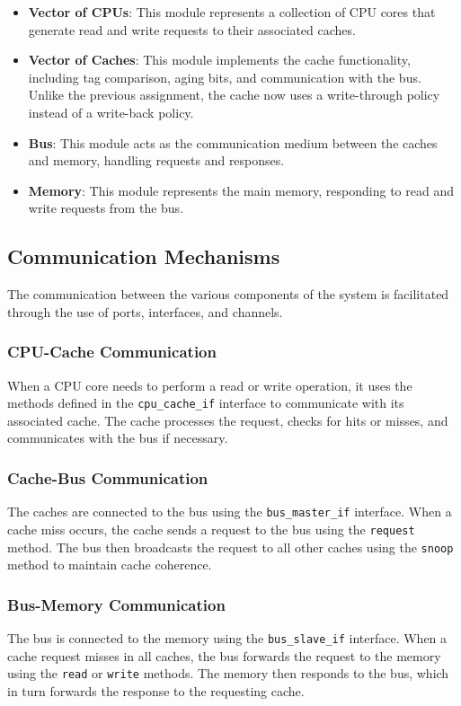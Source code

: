 \begin{itemize}
    \item \textbf{Vector of CPUs}: This module represents a collection of CPU cores that generate read and write requests to their associated caches.
    \item \textbf{Vector of Caches}: This module implements the cache functionality, including tag comparison, aging bits, and communication with the bus. Unlike the previous assignment, the cache now uses a write-through policy instead of a write-back policy.
    \item \textbf{Bus}: This module acts as the communication medium between the caches and memory, handling requests and responses.
    \item \textbf{Memory}: This module represents the main memory, responding to read and write requests from the bus.
\end{itemize}

\subsection{Communication Mechanisms}
The communication between the various components of the system is facilitated through the use of ports, interfaces, and channels.

\subsubsection{CPU-Cache Communication}
When a CPU core needs to perform a read or write operation, it uses the methods defined in the \texttt{cpu\_cache\_if} interface to communicate with its associated cache. The cache processes the request, checks for hits or misses, and communicates with the bus if necessary.

\subsubsection{Cache-Bus Communication}
The caches are connected to the bus using the \texttt{bus\_master\_if} interface. When a cache miss occurs, the cache sends a request to the bus using the \texttt{request} method. The bus then broadcasts the request to all other caches using the \texttt{snoop} method to maintain cache coherence.

\subsubsection{Bus-Memory Communication}
The bus is connected to the memory using the \texttt{bus\_slave\_if} interface. When a cache request misses in all caches, the bus forwards the request to the memory using the \texttt{read} or \texttt{write} methods. The memory then responds to the bus, which in turn forwards the response to the requesting cache.

